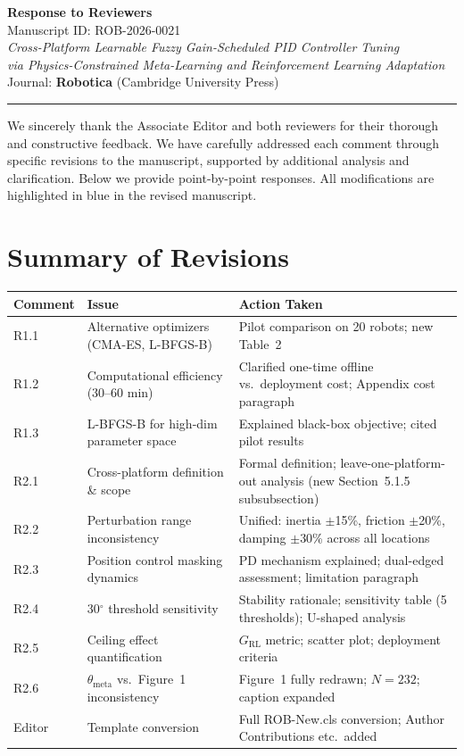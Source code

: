 \documentclass[11pt,a4paper]{article}
\newcommand{\rev}[1]{{\color{blue}#1}}
\begin{document}
\begin{center}
{\LARGE\bfseries Response to Reviewers}\\[0.8em]
{\large Manuscript ID: ROB-2026-0021}\\[0.3em]
{\large\itshape Cross-Platform Learnable Fuzzy Gain-Scheduled PID Controller Tuning\\
via Physics-Constrained Meta-Learning and Reinforcement Learning Adaptation}\\[0.3em]
{\large Journal: \textbf{Robotica} (Cambridge University Press)}\\[0.3em]
\end{center}

\bigskip
\hrule
\bigskip

We sincerely thank the Associate Editor and both reviewers for their thorough and constructive feedback. We have carefully addressed each comment through specific revisions to the manuscript, supported by additional analysis and clarification. Below we provide point-by-point responses. \rev{All modifications are highlighted in blue in the revised manuscript.}

\section*{Summary of Revisions}

\begin{longtable}{@{}p{}p{}p{}@{}}
\toprule
\textbf{Comment} & \textbf{Issue} & \textbf{Action Taken} \\
\midrule
\endhead
R1.1 & Alternative optimizers (CMA-ES, L-BFGS-B) & Pilot comparison on 20 robots; new Table~2 \\
R1.2 & Computational efficiency (30--60 min) & Clarified one-time offline vs.\ deployment cost; Appendix cost paragraph \\
R1.3 & L-BFGS-B for high-dim parameter space & Explained black-box objective; cited pilot results \\
R2.1 & Cross-platform definition \& scope & Formal definition; leave-one-platform-out analysis (new Section~5.1.5 subsubsection) \\
R2.2 & Perturbation range inconsistency & Unified: inertia $\pm$15\%, friction $\pm$20\%, damping $\pm$30\% across all locations \\
R2.3 & Position control masking dynamics & PD mechanism explained; dual-edged assessment; limitation paragraph \\
R2.4 & 30$^\circ$ threshold sensitivity & Stability rationale; sensitivity table (5 thresholds); U-shaped analysis \\
R2.5 & Ceiling effect quantification & $G_{\mathrm{RL}}$ metric; scatter plot; deployment criteria \\
R2.6 & $\theta_{\mathrm{meta}}$ vs.\ Figure~1 inconsistency & Figure~1 fully redrawn; $N=232$; caption expanded \\
Editor & Template conversion & Full ROB-New.cls conversion; Author Contributions etc.\ added \\
\bottomrule
\end{longtable}
\end{document}
